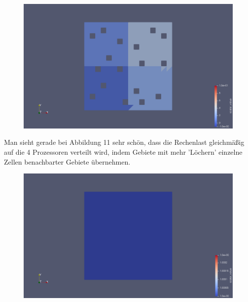\documentclass[12pt,a4paper]{scrartcl}
\numberwithin{equation}{section}
\begin{document}
\begin{enumerate}[label=(\roman*)]
\begin{figure}[H]
	\centering
		\includegraphics[width=\textwidth]{../Aufgabe6/Problem_Discontinuous/Mash_Square500/level_0/process.png} 
\end{figure}
Man sieht gerade bei Abbildung 11 sehr schön, dass die Rechenlast gleichmäßig auf die 4 Prozessoren verteilt wird, indem Gebiete mit mehr 'Löchern' einzelne Zellen benachbarter Gebiete übernehmen. \newline

\begin{figure}[H]
	\centering
\includegraphics[width=\textwidth]{../Problem_Simple2DMesh_UnitSquare8Triangelslevel_7/perm.png} 
\end{figure}



\end{enumerate}
\end{document}
